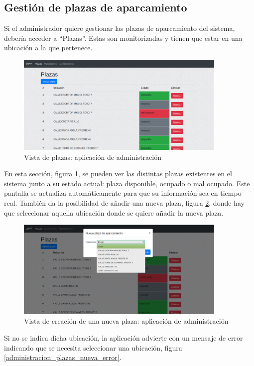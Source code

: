 \subsection{Gestión de plazas de aparcamiento}
Si el administrador quiere gestionar las plazas de aparcamiento del sistema, debería acceder a ``Plazas''. Estas son monitorizadas y tienen que estar en una ubicación a la que pertenece.
\begin{figure}[H]
	\centering
	\includegraphics[width=0.9\textwidth]{imagenes/administracion/plazas.png}
	\caption{Vista de plazas: aplicación de administración}
	\label{administracion_plazas}
\end{figure}
En esta sección, figura \ref{administracion_plazas}, se pueden ver las distintas plazas existentes en el sistema junto a su estado actual: plaza disponible, ocupado o mal ocupado. Este pantalla se actualiza automáticamente para que su información sea en tiempo real. También da la posibilidad de añadir una nueva plaza, figura \ref{administracion_plazas_nueva}, donde hay que seleccionar aquella ubicación donde se quiere añadir la nueva plaza.
\begin{figure}[H]
	\centering
	\includegraphics[width=0.9\textwidth]{imagenes/administracion/plazas_nueva.png}
	\caption{Vista de creación de una nueva plaza: aplicación de administración}
	\label{administracion_plazas_nueva}
\end{figure}
Si no se indica dicha ubicación, la aplicación advierte con un mensaje de error indicando que se necesita seleccionar una ubicación, figura \ref{administracion_plazas_nueva_error}.
